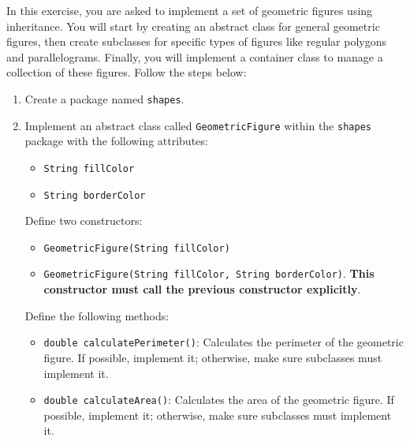 In this exercise, you are asked to implement a set of geometric figures using inheritance. You will start by creating an abstract class for general geometric figures, then create subclasses for specific types of figures like regular polygons and parallelograms. Finally, you will implement a container class to manage a collection of these figures. Follow the steps below:

\begin{enumerate}

    \item Create a package named \texttt{shapes}.

    \item Implement an abstract class called \texttt{GeometricFigure} within the \texttt{shapes} package with the following attributes:

        \begin{itemize}

            \item \texttt{String fillColor}

            \item \texttt{String borderColor}

        \end{itemize}

    Define two constructors:

        \begin{itemize}

            \item \texttt{GeometricFigure(String fillColor)}

            \item \texttt{GeometricFigure(String fillColor, String borderColor)}. \textbf{This constructor must call the previous constructor explicitly}.

        \end{itemize}

    Define the following methods:

        \begin{itemize}

            \item \texttt{double calculatePerimeter()}: Calculates the perimeter of the geometric figure. If possible, implement it; otherwise, make sure subclasses must implement it.

            \item \texttt{double calculateArea()}: Calculates the area of the geometric figure. If possible, implement it; otherwise, make sure subclasses must implement it.


\end{itemize}
\end{enumerate}

